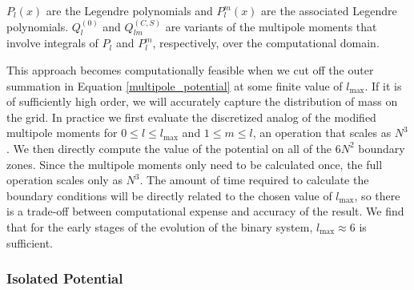 \documentclass[12pt,preprint]{aastex}
\begin{document}
$P_l(x)$ are the Legendre polynomials and $P_{l}^{m}(x)$ are the associated Legendre polynomials. $Q_l^{(0)}$ and $Q_{lm}^{(C,S)}$ are variants of the multipole moments that involve integrals of $P_l$ and $P_l^m$, respectively, over the computational domain.

This approach becomes computationally feasible when we cut off the outer summation in Equation \ref{multipole_potential} at some finite value of $l_{\text{max}}$. If it is of sufficiently high order, we will accurately capture the distribution of mass on the grid. In practice we first evaluate the discretized analog of the modified multipole moments for $0 \leq l \leq l_{\text{max}}$ and $1 \leq m \leq l$, an operation that scales as $N^3$. We then directly compute the value of the potential on all of the $6N^2$ boundary zones. Since the multipole moments only need to be calculated once, the full operation scales only as $N^3$. The amount of time required to calculate the boundary conditions will be directly related to the chosen value of $l_{\text{max}}$, so there is a trade-off between computational expense and accuracy of the result. We find that for the early stages of the evolution of the binary system, $l_\text{max} \approx 6$ is sufficient.

\subsubsection{Isolated Potential}
\end{document}
